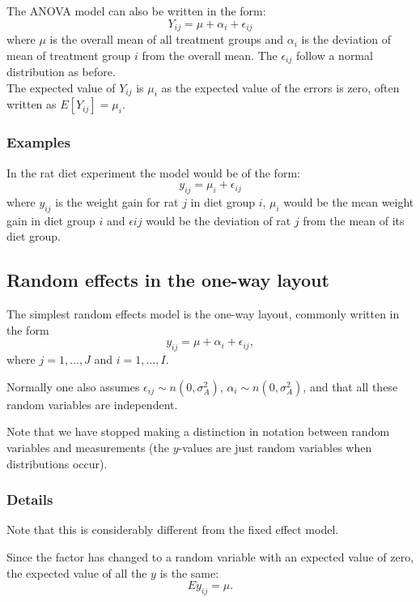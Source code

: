 \documentclass[12pt,a4paper]{article}
\theoremstyle{regla}
\theoremstyle{remark}
\theoremstyle{definition}
\theoremstyle{nonumberbreak}
\begin{document}
The ANOVA model can also be written in the form:
$$Y_{ij}=\mu+\alpha_i+\epsilon_{ij}$$
where $\mu$ is the overall mean of all treatment groups and $\alpha_i$ is the deviation of mean of treatment group $i$ from the overall mean. The $\epsilon_{ij}$ follow a normal distribution as before.\\

The expected value of $Y_{ij}$ is $\mu_i$ as the expected value of the errors is zero, often written as $E[Y_{ij}]=\mu_i$.
\subsubsection{Examples}
\begin{xmpl}
In the rat diet experiment the model would be of the form:
$$y_{ij}=\mu_i+\epsilon_{ij}$$
where $y_{ij}$ is the weight gain for rat $j$ in diet group $i$, $\mu_i$ would be the mean weight gain in diet group $i$ and $\epsilon{ij}$ would be the deviation of rat $j$ from the mean of its diet group.
\end{xmpl}

\subsection{Random effects in the one-way layout}
\begin{fbox}
\begin{minipage}{0.97\textwidth}
The simplest random effects model is the one-way layout, commonly written in the form
$$y_{ij}=\mu + \alpha_i + \epsilon_{ij},$$
where $j =1,\ldots,J$ and $i =1,\ldots,I$.

Normally one also assumes $\epsilon_{ij}\sim n (0,\sigma_A^2)$, $\alpha_i \sim n (0,\sigma_A^2)$, and that all these random variables are independent.

Note that we have stopped making a distinction in notation between random variables and measurements (the $y$-values are just random variables when distributions occur).

\end{minipage}
\end{fbox}
\subsubsection{Details}
Note that this is considerably different from the fixed effect model.

Since the factor has changed to a random variable with an expected value of zero, the expected value of all the $y$ is the same:
$$Ey_{ij}=\mu .$$
\end{document}
